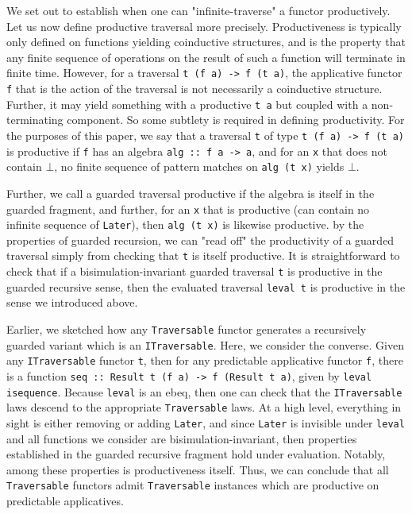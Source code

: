 \documentclass[hoptionsi,review,format=sigplan]{acmart}
\newcommand{\hs}{\texttt}
\begin{document}

We set out to establish when one can "infinite-traverse" a functor productively. Let us now define productive traversal more precisely. Productiveness is typically only defined on functions yielding coinductive structures, and is the property that any finite sequence of operations on the result of such a function will terminate in finite time. However, for a traversal \hs{t (f a) -> f (t a)}, the applicative functor \hs{f} that is the action of the traversal is not necessarily a coinductive structure. Further, it may yield something with a productive \hs{t a} but coupled with a non-terminating component. So some subtlety is required in defining productivity. For the purposes of this paper, we say that a traversal \hs{t} of type \hs{t (f a) -> f (t a)} is productive if \hs{f} has an algebra \hs{alg :: f a -> a}, and for an \hs{x} that does not contain $\bot$, no finite sequence of pattern matches on \hs{alg (t x)} yields $\bot$.

Further, we call a guarded traversal productive if the algebra is itself in the guarded fragment, and further, for an \hs{x} that is productive (can contain no infinite sequence of \hs{Later}), then \hs{alg (t x)} is likewise productive. by the properties of guarded recursion, we can "read off" the productivity of a guarded traversal simply from checking that \hs{t} is itself productive. It is straightforward to check that if a bisimulation-invariant guarded traversal \hs{t} is productive in the guarded recursive sense, then the evaluated traversal \hs{leval t} is productive in the sense we introduced above.

Earlier, we sketched how any \hs{Traversable} functor generates a recursively guarded variant which is an \hs{ITraversable}. Here, we consider the converse. Given any \hs{ITraversable} functor \hs{t}, then for any predictable applicative functor \hs{f}, there is a function \hs{seq :: Result t (f a) -> f (Result t a)}, given by \hs{leval isequence}. Because \hs{leval} is an ebeq, then one can check that the \hs{ITraversable} laws descend to the appropriate \hs{Traversable} laws. At a high level, everything in sight is either removing or adding \hs{Later}, and since \hs{Later} is invisible under \hs{leval} and all functions we consider are bisimulation-invariant, then properties established in the guarded recursive fragment hold under evaluation. Notably, among these properties is productiveness itself. Thus, we can conclude that all \hs{Traversable} functors admit \hs{Traversable} instances which are productive on predictable applicatives.
\end{document}
